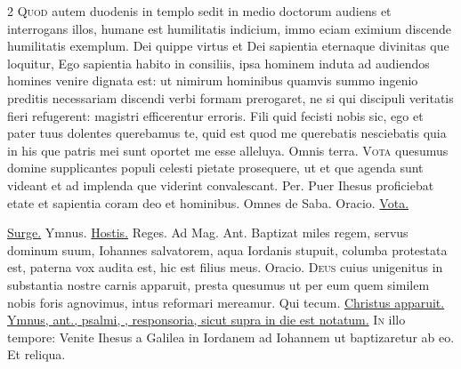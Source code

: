 \begin{multicols*}{2}
\lettrine[lines=2]{\zallmancaps \color{Red} Q}{uod} autem duodenis in templo sedit in medio doctorum audiens et interrogans illos, humane est humilitatis indicium, immo eciam eximium discende humilitatis exemplum. Dei quippe virtus et Dei sapientia eternaque divinitas que loquitur, Ego sapientia habito in consiliis, ipsa hominem induta ad audiendos homines venire dignata est: ut nimirum hominibus quamvis summo ingenio preditis necessariam discendi verbi formam prerogaret, ne si qui discipuli veritatis fieri refugerent: magistri efficerentur erroris.
 Fili quid fecisti nobis sic, ego et pater tuus dolentes querebamus te, quid est quod me querebatis nesciebatis quia in his que patris mei sunt oportet me esse alleluya. \V Omnis terra.
\lettrine[lines=2]{\zallmancaps \color{Blue} V}{ota} \hypertarget{vota-quesumus-epiphanie}{quesumus} domine supplicantes populi celesti pietate prosequere, ut et que agenda sunt videant et ad implenda que viderint convalescant. Per.
 Puer Ihesus proficiebat etate et sapientia coram deo et hominibus. \V Omnes de Saba. {\color{Red} Oracio.} \hyperlink{vota-quesumus-epiphanie}{Vota.}
{\color{Red} }
\par {} \hyperlink{surge-capitulum}{Surge.} {\color{Red} Ymnus.} \hyperlink{hostis-herodes}{Hostis.} \V Reges. {\color{Red} Ad Mag. Ant.} Baptizat miles regem, servus dominum suum, Iohannes salvatorem, aqua Iordanis stupuit, columba protestata est, paterna vox audita est, hic est filius meus. {\color{Red} Oracio.}
\lettrine[lines=2]{\zallmancaps \color{Red} D}{eus} \hypertarget{deus-cuius-unigenitus-epiphanie}{cuius} unigenitus in substantia nostre carnis apparuit, presta quesumus ut per eum quem similem nobis foris agnovimus, intus reformari mereamur. Qui tecum.
 \hyperlink{christus-apparuit-invitatorium}{Christus apparuit.} \ul{Ymnus, ant., psalmi, \Vbar , responsoria, sicut supra in die est notatum.}
\lettrine[lines=2]{\zallmancaps \color{Blue} I}{n} illo tempore: Venite Ihesus a Galilea in Iordanem ad Iohannem ut baptizaretur ab eo. Et reliqua.
 \grecross

\end{multicols*}

